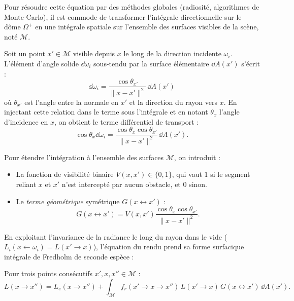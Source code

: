 Pour résoudre cette équation par des méthodes globales (radiosité, algorithmes de Monte-Carlo), il est commode de transformer l'intégrale directionnelle sur le dôme $\Omega^+$ en une intégrale spatiale sur l'ensemble des surfaces visibles de la scène, noté $\mathcal{M}$.

Soit un point $x' \in \mathcal{M}$ visible depuis $x$ le long de la direction incidente $\omega_i$. L'élément d'angle solide $\dd\omega_i$ sous-tendu par la surface élémentaire $\dd A(x')$ s'écrit :
\begin{equation}
    \dd\omega_i = \frac{\cos\theta_{x'}}{\|x - x'\|^2} \, \dd A(x')
\end{equation}
où $\theta_{x'}$ est l'angle entre la normale en $x'$ et la direction du rayon vers $x$. En injectant cette relation dans le terme sous l'intégrale et en notant $\theta_x$ l'angle d'incidence en $x$, on obtient le terme différentiel de transport :
\begin{equation}
    \cos\theta_x \dd\omega_i = \frac{\cos\theta_x \cos\theta_{x'}}{\|x - x'\|^2} \, \dd A(x').
\end{equation}

Pour étendre l'intégration à l'ensemble des surfaces $\mathcal{M}$, on introduit :
\begin{itemize}
    \item La fonction de visibilité binaire $V(x, x') \in \{0, 1\}$, qui vaut $1$ si le segment reliant $x$ et $x'$ n'est intercepté par aucun obstacle, et $0$ sinon.
    \item Le \emph{terme géométrique} symétrique $G(x \leftrightarrow x')$ :
    \begin{equation}
        G(x \leftrightarrow x') = V(x, x') \frac{\cos\theta_x \cos\theta_{x'}}{\|x - x'\|^2}.
    \end{equation}
\end{itemize}

En exploitant l'invariance de la radiance le long du rayon dans le vide ($L_i(x \leftarrow \omega_i) = L(x' \to x)$), l'équation du rendu prend sa forme surfacique intégrale de Fredholm de seconde espèce :

\begin{proposition}
    Pour trois points consécutifs $x', x, x'' \in \mathcal{M}$ :
    \begin{equation}
        L(x \to x'') = L_e(x \to x'') + \int_{\mathcal{M}} f_r(x' \to x \to x'') \, L(x' \to x) \, G(x \leftrightarrow x') \, \dd A(x').
    \end{equation}
\end{proposition}

